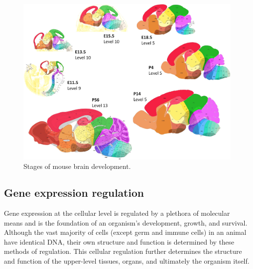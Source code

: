 \documentclass[12pt,oneside,onecolumn,a4paper]{article}
\begin{document}
\begin{figure}[h!]
\begin{center}
\includegraphics[width=0.7\columnwidth]{figures/160913_thompson_atlas/160913_thompson_atlas}
\caption{Stages of mouse brain development. \citep{Thompson_2014}%
}
\end{center}
\end{figure}

\subsection{Gene expression regulation}
Gene expression at the cellular level is regulated by a plethora of molecular means and is the foundation of an organism's development, growth, and survival. Although the vast majority of cells (except germ and immune cells) in an animal have identical DNA, their own structure and function is determined by these methods of regulation. This cellular regulation further determines the structure and function of the upper-level tissues, organs, and ultimately the organism itself. 
\end{document}
